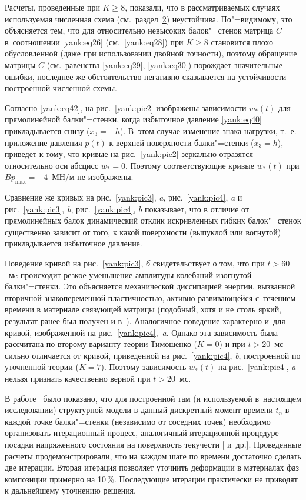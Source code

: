 Расчеты, проведенные при $K\ge 8$, показали, что в рассматриваемых случаях
используемая численная схема (см.~раздел~\hyperlink{yan:sec2}{2}) неустойчива. 
По"=видимому, это объясняется тем, что для относительно невысоких балок"=стенок матрица $C$ в~соотношении \eqref{yank:eq26} (см.~\eqref{yank:eq28}) при $K\ge 8$ становится плохо обусловленной
(даже при использовании двойной точности), поэтому обращение матрицы $C$ (см.~равенства \eqref{yank:eq29}, \eqref{yank:eq30}) порождает значительные ошибки, последнее же
обстоятельство негативно сказывается на устойчивости построенной численной
схемы.

Согласно \eqref{yank:eq42}, на рис.~\ref{yank:pic2} изображены зависимости $w_\ast ( t )$
для прямолинейной балки"=стенки, когда избыточное давление \eqref{yank:eq40}
прикладывается снизу ($x_3 =-h$). 
В~этом случае изменение знака нагрузки, т.~е. приложение давления $p( t )$ к верхней поверхности
балки"=стенки ($x_3 =h$), приведет к тому, что кривые на рис.~\ref{yank:pic2} зеркально
отразятся относительно оси абсцисс $w_\ast =0$. Поэтому соответствующие
кривые $w_\ast ( t )$ при $Bp_{\max } =-4$~МН/м не изображены.

Сравнение же кривых на рис.~\ref{yank:pic3}, {\sl a}, рис.~\ref{yank:pic4}, {\sl a} и рис.~\ref{yank:pic3}, {\sl b}, рис.~\ref{yank:pic4}, {\sl b}
показывает, что в отличие от прямолинейных балок динамический отклик
искривленных гибких балок"=стенок существенно зависит от того, к какой
поверхности (выпуклой или вогнутой) прикладывается избыточное давление.

Поведение кривой на рис.~\ref{yank:pic3}, {\sl б} свидетельствует о том, что при
$t>60$~мc происходит резкое уменьшение амплитуды колебаний
изогнутой балки"=стенки. Это объясняется механической диссипацией энергии,
вызванной вторичной знакопеременной пластичностью, активно развивающейся с~течением времени в материале связующей матрицы (подобный, хотя и не столь
яркий, результат ранее был получен и в~\cite{yank:bib15}). Аналогичное поведение
характерно и~для кривой, изображенной на рис.~\ref{yank:pic4},~{\sl a}. Однако эта зависимость
была рассчитана по второму варианту теории Тимошенко ($K=0$) и при
$t>20$~мс сильно отличается от кривой, приведенной на рис.~\ref{yank:pic4}, {\sl b},
построенной по уточненной теории ($K=7$). 
Поэтому зависимость $w_\ast (t)$ на рис.~\ref{yank:pic4}, {\sl a} нельзя признать качественно верной при
$t>20$~мс.

В работе~\cite{yank:bib13} было показано, что для построенной там (и используемой в~настоящем исследовании) структурной модели в данный дискретный момент
времени $t_n$ в каждой точке балки"=стенки (независимо от соседних точек)
необходимо организовать итерационный процесс, аналогичный итерационной
процедуре посадки напряженного состояния на поверхность текучести [ и~др.]. Проведенные расчеты продемонстрировали, что на каждом шаге по времени
достаточно сделать две итерации. Вторая итерация позволяет уточнить
деформации в материалах фаз композиции примерно на 10\,\%. Последующие
итерации практически не приводят к дальнейшему уточнению решения.

